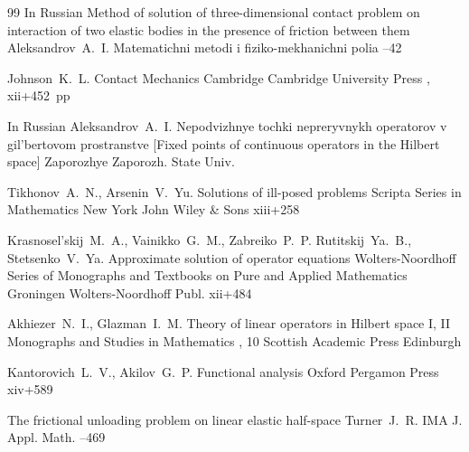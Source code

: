 \begin{thebibliography}{99}
\lang In Russian
\paper Method of solution of three-dimensional contact problem on interaction of two elastic bodies in the presence of friction between them
\by    Aleksandrov~A.~I.
\jour Matematichni metodi i fiziko-mekhanichni polia
--42


\by Johnson~K.~L.
\book Contact Mechanics
\publaddr Cambridge 
\publ Cambridge University Press 
,
xii+452~pp


\lang In Russian
\by Aleksandrov~A.~I.
\book Nepodvizhnye tochki nepreryvnykh operatorov v gil'bertovom prostranstve \rm [Fixed points of continuous operators in the Hilbert space]
\publaddr Zaporozhye 
\publ Zaporozh. State Univ.


\by Tikhonov~A.~N., Arsenin~V.~Yu.
\book Solutions of ill-posed problems
\serial Scripta Series in Mathematics
\publaddr New York 
\publ John Wiley \& Sons
\totalpages xiii+258 

\by Krasnosel'skij~M.~A., Vainikko~G.~M., Zabreiko~P.~P. Rutitskij~Ya.~B., Stetsenko~V.~Ya.
\book Approximate solution of operator equations
\serial Wolters-Noordhoff Series of Monographs and Textbooks on Pure and Applied Mathematics
\publaddr Groningen
\publ Wolters-Noordhoff Publ.
\totalpages xii+484 

\by Akhiezer~N.~I., Glazman~I.~M.
\book Theory of linear operators in Hilbert space
\bookvol I, II
\serial Monographs and Studies in Mathematics
, 10
\publ Scottish Academic Press
\publaddr Edinburgh

\by Kantorovich~L.~V., Akilov~G.~P.
\book Functional analysis
\publaddr Oxford 
\publ  Pergamon Press
\totalpages xiv+589 

\paper The frictional unloading problem on linear elastic half-space
\by    Turner~J.~R.
\jour  IMA J. Appl. Math.
--469

\end{thebibliography}

\EngDate

\Russian
\newpage


%
